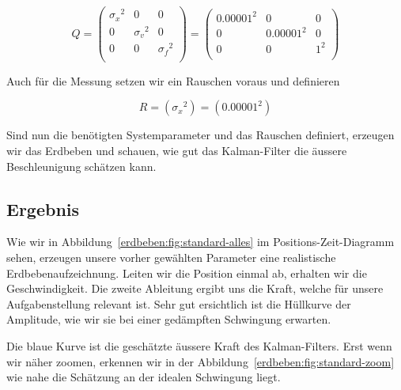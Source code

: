\begin{equation}
	Q = \left(
	\begin{array}{ccc}
		{\sigma_x }^2& 0& 0 \\
		0 & {\sigma_v }^2& 0\\
		0 & 0& {\sigma_f }^2\\
	\end{array}\right)= \left(
	\begin{array}{ccc}
		{0.00001}^2& 0& 0 \\
		0 & {0.00001}^2& 0\\
		0 & 0& {1 }^2\\
	\end{array}\right)
\end{equation}

Auch für die Messung setzen wir ein Rauschen voraus und definieren

\begin{equation}
R= ({\sigma_x}^2)=
({0.00001}^2)
\end{equation}

Sind nun die benötigten Systemparameter und das Rauschen definiert, erzeugen wir das Erdbeben und schauen, wie gut das Kalman-Filter die äussere Beschleunigung schätzen kann.

\subsection*{Ergebnis}

Wie wir in Abbildung~\ref{erdbeben:fig:standard-alles} im Positions-Zeit-Diagramm sehen, erzeugen unsere vorher gewählten Parameter eine realistische Erdbebenaufzeichnung.
Leiten wir die Position einmal ab, erhalten wir die Geschwindigkeit.
Die zweite Ableitung ergibt uns die Kraft, welche für unsere Aufgabenstellung relevant ist.
Sehr gut ersichtlich ist die Hüllkurve der Amplitude, wie wir sie bei einer gedämpften Schwingung erwarten.

Die blaue Kurve ist die geschätzte äussere Kraft des Kalman-Filters.
Erst wenn wir näher zoomen, erkennen wir in der Abbildung~\ref{erdbeben:fig:standard-zoom} wie nahe die Schätzung an der idealen Schwingung liegt.

